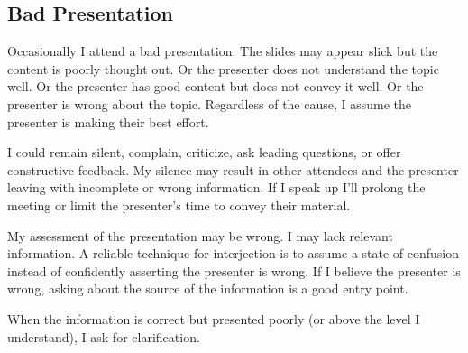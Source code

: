 \subsection{Bad Presentation}

Occasionally I attend a bad presentation. The slides may appear slick but the content is poorly thought out. Or the presenter does not understand the topic well. Or the presenter has good content but does not convey it well. Or the presenter is wrong about the topic. Regardless of the cause, I assume the presenter is making their best effort. 

I could remain silent, complain, criticize, ask leading questions, or offer constructive feedback. My silence may result in other attendees and the presenter leaving with incomplete or wrong information. If I speak up I'll prolong the meeting or limit the presenter's time to convey their material. 

My assessment of the presentation may be wrong. I may lack relevant information. A reliable technique for interjection is to assume a state of confusion instead of confidently asserting the presenter is wrong. 
If I believe the presenter is wrong, asking about the source of the information is a good entry point.

When the information is correct but presented poorly (or above the level I understand), I ask for clarification. 
